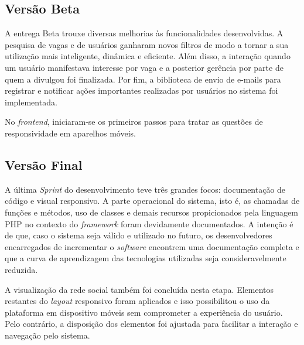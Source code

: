 \subsection{Versão Beta}
\label{implementacaoBR}

A entrega Beta trouxe diversas melhorias às funcionalidades desenvolvidas. A pesquisa de vagas e de usuários ganharam novos filtros de modo a tornar a sua utilização mais inteligente, dinâmica e eficiente. Além disso, a interação quando um usuário manifestava interesse por vaga e a posterior gerência por parte de quem a divulgou foi finalizada. Por fim, a biblioteca de envio de e-mails para registrar e notificar ações importantes realizadas por usuários no sistema foi implementada.

No \textit{frontend}, iniciaram-se os primeiros passos para tratar as questões de responsividade em aparelhos móveis.

\subsection{Versão Final}
\label{implementacaoFR}

A última \textit{Sprint} do desenvolvimento teve três grandes focos: documentação de código e visual responsivo.  A parte operacional do sistema, isto é, as chamadas de funções e métodos, uso de classes e demais recursos propicionados pela linguagem PHP no contexto do \textit{framework} foram devidamente documentados. A intenção é de que, caso o sistema seja válido e utilizado no futuro, os desenvolvedores encarregados de incrementar o \textit{software} encontrem uma documentação completa e que a curva de aprendizagem das tecnologias utilizadas seja consideravelmente reduzida.

A visualização da rede social também foi concluída nesta etapa. Elementos restantes do \textit{layout} responsivo foram aplicados e isso possibilitou o uso da plataforma em dispositivo móveis sem comprometer a experiência do usuário. Pelo contrário, a disposição dos elementos foi ajustada para facilitar a interação e navegação pelo sistema.